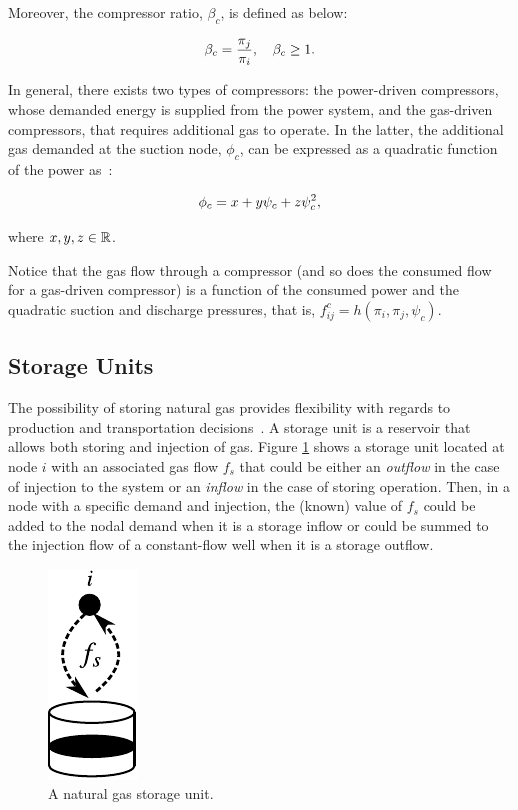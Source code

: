 Moreover, the compressor ratio, $\beta_c$, is defined as below:

\begin{equation}
	\label{eq:comp_ratio}
	\beta_c = \frac{\pi_j}{\pi_i}, \quad \beta_c\geq 1.
	\vspace{0.3cm}
\end{equation}

In general, there exists two types of compressors: the power-driven compressors, whose demanded energy is supplied from the power system, and the gas-driven compressors, that requires additional gas to operate. In the latter, the additional gas demanded at the suction node, $\phi_c$, can be expressed as a quadratic function of the power as~\cite{Chen2017}:

\begin{equation}
	\label{eq:f_cons_gas_comp}
	\phi_c = x+y\psi_c+z\psi_c^2, 
	\vspace{0.3cm}
\end{equation}

where $x,y,z \in \mathbb{R}$.

Notice that the gas flow through a compressor (and so does the consumed flow for a gas-driven compressor) is a function of the consumed power and the quadratic suction and discharge pressures, that is, $f_{ij}^c=h(\pi_i,\pi_j,\psi_c)$. 

\subsection{Storage Units}
\label{subsec:sto_units}

The possibility of storing natural gas provides flexibility with regards to production and transportation decisions~\cite{Midthun2007}. A storage unit is a reservoir that allows both storing and injection of gas. Figure \ref{fig:storage} shows a storage unit located at node $i$ with an associated gas flow $f_s$ that could be either an \textit{outflow} in the case of injection to the system or an \textit{inflow} in the case of storing operation. Then, in a node with a specific demand and injection, the (known) value of $f_s$ could be added to the nodal demand when it is a storage inflow or could be summed to the injection flow of a constant-flow well when it is a storage outflow.

\begin{figure}[!ht]
	\centering
	\includegraphics[scale=1]{Figures/Storage_unit}
	\caption{A natural gas storage unit.}	
	\label{fig:storage}
\end{figure}

